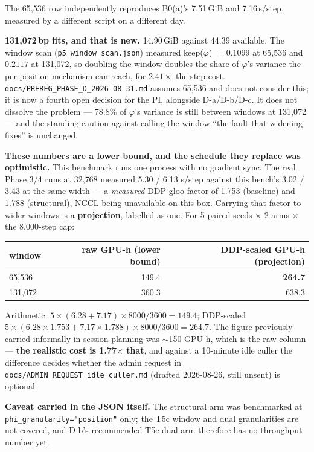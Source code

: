 \documentclass[11pt,a4paper]{article}
\newcommand{\code}[1]{\texttt{\small #1}}
\begin{document}
The 65{,}536 row independently reproduces B0(a)'s 7.51\,GiB and 7.16\,s/step,
measured by a different script on a different day.

\textbf{131{,}072\,bp fits, and that is new.} 14.90\,GiB against 44.39
available. The window scan (\code{p5\_window\_scan.json}) measured keep($\varphi$)
$= 0.1099$ at 65{,}536 and $0.2117$ at 131{,}072, so doubling the window
doubles the share of $\varphi$'s variance the per-position mechanism can reach,
for $2.41\times$ the step cost. \code{docs/PREREG\_PHASE\_D\_2026-08-31.md}
assumes 65{,}536 and does not consider this; it is now a fourth open decision
for the PI, alongside D-a/D-b/D-c. It does not dissolve the problem --- 78.8\%
of $\varphi$'s variance is still between windows at 131{,}072 --- and the
standing caution against calling the window ``the fault that widening fixes''
is unchanged.

\textbf{These numbers are a lower bound, and the schedule they replace was
optimistic.} This benchmark runs one process with no gradient sync. The real
Phase 3/4 runs at 32{,}768 measured 5.30 / 6.13 s/step against this bench's
3.02 / 3.43 at the same width --- a \emph{measured} DDP-gloo factor of
1.753 (baseline) and 1.788 (structural), NCCL being unavailable on this box.
Carrying that factor to wider windows is a \textbf{projection}, labelled as
one. For 5 paired seeds $\times$ 2 arms $\times$ the 8{,}000-step cap:

\begin{center}
\begin{tabular}{lrr}
\hline
window & raw GPU-h (lower bound) & DDP-scaled GPU-h (projection) \\
\hline
65{,}536  & 149.4 & \textbf{264.7} \\
131{,}072 & 360.3 & 638.3 \\
\hline
\end{tabular}
\end{center}

Arithmetic: $5 \times (6.28 + 7.17) \times 8000 / 3600 = 149.4$; DDP-scaled
$5 \times (6.28 \times 1.753 + 7.17 \times 1.788) \times 8000 / 3600 = 264.7$.
The figure previously carried informally in session planning was $\sim$150
GPU-h, which is the raw column --- \textbf{the realistic cost is 1.77$\times$
that}, and against a 10-minute idle culler the difference decides whether the
admin request in \code{docs/ADMIN\_REQUEST\_idle\_culler.md} (drafted
2026-08-26, still unsent) is optional.

\textbf{Caveat carried in the JSON itself.} The structural arm was benchmarked
at \code{phi\_granularity="position"} only; the T5c window and dual
granularities are not covered, and D-b's recommended T5c-dual arm therefore has
no throughput number yet.
\end{document}
